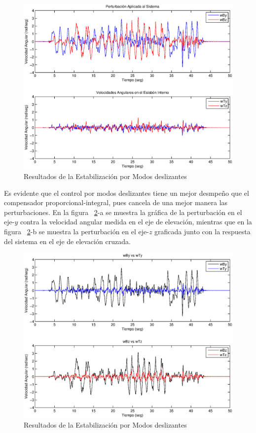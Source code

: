\begin{figure}[H]
\centering \includegraphics[scale=0.63,trim = 20mm 0mm 20mm 0mm]{img/ResSMPer.eps}
      \caption{Resultados de la Estabilizaci\'{o}n por Modos deslizantes}
      \label{fig:ResSMPer}
\end{figure}

Es evidente que el control por modos deslizantes tiene un mejor desmpe\~{n}o que el compensador proporcional-integral, pues cancela de una mejor manera las perturbaciones. En la figura ~\ref{fig:ResSMVs}-a se muestra la gr\'{a}fica de la perturbaci\'{o}n en el eje-$y$ contra la velocidad angular medida en el eje de elevaci\'{o}n, mientras que en la figura ~\ref{fig:ResSMVs}-b se muestra la perturbaci\'{o}n en el eje-$z$ graficada junto con la respuesta del sistema en el eje de elevaci\'{o}n cruzada. 

\begin{figure}[H]
\centering \includegraphics[scale=0.63,trim = 20mm 0mm 20mm 0mm]{img/ResSMVs.eps}
      \caption{Resultados de la Estabilizaci\'{o}n por Modos deslizantes}
      \label{fig:ResSMVs}
\end{figure}

